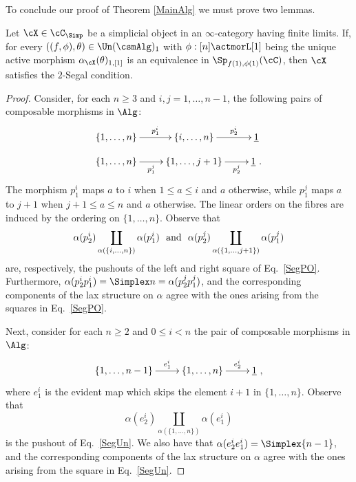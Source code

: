 \documentclass[a4paper]{article}
\numberwithin{equation}{section}
\begin{document}
To conclude our proof of Theorem \ref{MainAlg} we must prove two lemmas. 

\begin{lem}
 \label{sublemone}
 Let $\cX \in \cC_\Simp$ be a simplicial object in an $\infty$-category having finite limits. If, for every $\left((f,\phi), \theta\right) \in \Un(\csmAlg)_1$ with $\phi:[n]\actmorL [1]$ being the unique active morphism $\alpha_\cX(\theta)_{1,[1]}$ is an equivalence in $\Sp_{f(1),\phi(1)}(\cC)$, then $\cX$ satisfies the $2$-Segal condition.
\end{lem}
\begin{proof}
Consider, for each $n\geq 3$ and $i,j =1,\ldots, n-1$, the following pairs of composable morphisms in $\Alg$:
\begin{equation}
\label{SegPair}
 \xymatrixrowsep{.8pc} \xymatrix{\{1,\ldots,n\} \ar[r]^-{p^i_1} & \{i,\ldots,n\} \ar[r]^-{p^i_2} & \underline{1} \\
 \{1,\ldots,n\} \ar[r]_-{p^j_1} & \{1,\ldots,j+1\} \ar[r]_-{p^j_2} & \underline{1} \ .} 
\end{equation}
The morphism $p^i_1$ maps $a$ to $i$ when $1\leq a \leq i$ and $a$ otherwise, while $p^j_1$ maps $a$ to $j+1$ when $j+1 \leq a \leq n$ and $a$ otherwise. The linear orders on the fibres are induced by the ordering on $\{1,\ldots, n\}$. Observe that 
\begin{equation*}
\alpha(p^i_2) \coprod_{\alpha(\{i,\ldots,n\})} \alpha(p^i_1) \ \  {\rm and} \ \ \alpha(p^j_2) \coprod_{\alpha(\{1,\ldots,j+1\})} \alpha(p^j_1)
\end{equation*}
are, respectively, the pushouts of the left and right square of Eq.~\ref{SegPO}. Furthermore, $\alpha(p^i_2 p^i_1) = \Simplex n = \alpha(p^j_2 p^j_1)$, and the corresponding components of the lax structure on $\alpha$ agree with the ones arising from the squares in Eq.~\ref{SegPO}.

Next, consider for each $n \geq 2$ and $0\leq i < n$ the pair of composable morphisms in $\Alg$:
\begin{equation}
\label{UnitPair}
 \xymatrix{ \{1,\ldots, n-1\} \ar[r]^-{e^i_1} & \{1,\ldots, n\} \ar[r]^-{e^i_2} & \underline{1} \ ,}
\end{equation}
where $e^i_1$ is the evident map which skips the element $i+1$ in $\{1,\ldots, n\}$. Observe that 
\begin{equation*}
 \alpha(e^i_2) \coprod_{\alpha(\{1,\ldots,n\})} \alpha(e^i_1)
\end{equation*}
is the pushout of Eq.~\ref{SegUn}. We also have that $\alpha(e^i_2 e^i_1) = \Simplex{n-1}$, and the corresponding components of the lax structure on $\alpha$ agree with the ones arising from the square in Eq.~\ref{SegUn}.


\end{proof}
\end{document}
